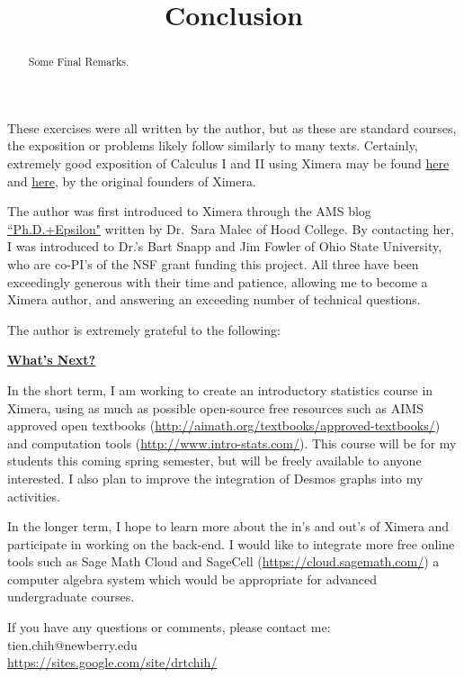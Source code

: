 \documentclass{ximera}
\title{Conclusion}
\begin{document}
      
\begin{abstract}
      
Some Final Remarks.      
\end{abstract}
      
\maketitle
      
      
These exercises were all written by the author, but as these are standard courses, the exposition or problems likely follow similarly to many texts.  Certainly, extremely good exposition of Calculus I and II using Ximera may be found \href{http://ximera.osu.edu/course/mooculus/calculus1/}{here} and \href{http://ximera.osu.edu/course/mooculus/calculus2/}{here}, by the original founders of Ximera.

The author was first introduced to Ximera through the AMS blog \href{http://blogs.ams.org/phdplus/2016/08/31/the-ximera-project-turning-latex-into-interactive-websites/#sthash.b9OeivZv.dpbs}{``Ph.D.+Epsilon"} written by Dr.\  Sara Malec of Hood College.  By contacting her, I was introduced to Dr.'s Bart Snapp and Jim Fowler of Ohio State University, who are co-PI's of the NSF grant funding this project.  All three have been exceedingly generous with their time and patience, allowing me to become a Ximera author, and answering an exceeding number of technical questions.

\begin{question}
The author is extremely grateful to the following:
\begin{selectAll}



\end{selectAll}
\end{question}

\textbf{\underline{What's Next?}}

In the short term, I am working to create an introductory statistics course in Ximera, using as much as possible open-source free resources such as AIMS approved open textbooks (\url{http://aimath.org/textbooks/approved-textbooks/}) and computation tools (\url{http://www.intro-stats.com/}).  This course will be for my students this coming spring semester, but will be freely available to anyone interested.  I also plan to improve the integration of Desmos graphs into my activities.

In the longer term, I hope to learn more about the in's and out's of Ximera and participate in working on the back-end.  I would like to integrate more free online tools such as Sage Math Cloud and SageCell (\url{https://cloud.sagemath.com/}) a computer algebra system which would be appropriate for advanced undergraduate courses.

If you have any questions or comments, please contact me:\\
tien.chih@newberry.edu\\
\url{https://sites.google.com/site/drtchih/}
\end{document}
